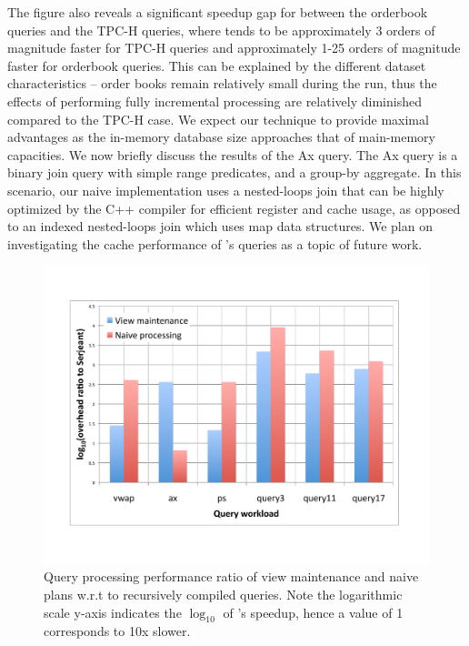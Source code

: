 The figure also reveals a significant speedup gap for \compiler between the
orderbook queries and the TPC-H queries, where \compiler tends to be
approximately 3 orders of magnitude faster for TPC-H queries and approximately
1-25 orders of magnitude faster for orderbook queries. This can be explained by
the different dataset characteristics -- order books remain relatively small
during the run, thus the effects of performing fully incremental processing are
relatively diminished compared to the TPC-H case. We expect our technique to
provide maximal advantages as the in-memory database size approaches that of
main-memory capacities.
We now briefly discuss the results of the Ax query. The
Ax query is a binary join query with simple range predicates, and a group-by
aggregate. In this scenario, our naive implementation uses a nested-loops join
that can be highly optimized by the C++ compiler for efficient register and
cache usage, as opposed to an indexed nested-loops join which uses map data
structures. We plan on investigating the cache performance of \compiler's
queries as a topic of future work.

\begin{figure}[tb]
\hspace{-3mm}\includegraphics[scale=0.33]{figures/cpu-comparison}
\vspace{-10mm}
\caption{Query processing performance ratio of view maintenance and naive plans
  w.r.t to recursively compiled queries. Note the logarithmic scale y-axis
  indicates the $\log_{10}$ of \compiler's speedup, hence a value of 1
  corresponds to 10x  slower.}
\label{fig:cpucomp}
\end{figure}

